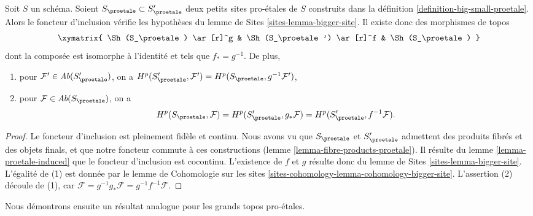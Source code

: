 \begin{lemma}
\label{lemma-proetale-cohomology-independent-partial-universe}
Soit $S$ un schéma. Soient $S_\proetale \subset S_\proetale'$ deux
petits sites pro-\'etales de $S$ construits dans la
définition \ref{definition-big-small-proetale}. Alors le foncteur d'inclusion
vérifie les hypothèses du
lemme de Sites \ref{sites-lemma-bigger-site}.
Il existe donc des morphismes de topos
$$
\xymatrix{
\Sh(S_\proetale) \ar[r]^g &
\Sh(S_\proetale') \ar[r]^f &
\Sh(S_\proetale)
}
$$
dont la composée est isomorphe à l'identité et tels que $f_* = g^{-1}$.
De plus,
\begin{enumerate}
\item pour $\mathcal{F}' \in \textit{Ab}(S_\proetale')$, on a
$H^p(S_\proetale', \mathcal{F}') = H^p(S_\proetale, g^{-1}\mathcal{F}')$,
\item pour $\mathcal{F} \in \textit{Ab}(S_\proetale)$, on a
$$
H^p(S_\proetale, \mathcal{F}) =
H^p(S_\proetale', g_*\mathcal{F}) =
H^p(S_\proetale', f^{-1}\mathcal{F}).
$$
\end{enumerate}
\end{lemma}

\begin{proof}
Le foncteur d'inclusion est pleinement fidèle et continu.
Nous avons vu que $S_\proetale$ et $S_\proetale'$ admettent des produits fibrés
et des objets finals, et que notre foncteur commute à ces constructions
(lemme \ref{lemma-fibre-products-proetale}).
Il résulte du lemme \ref{lemma-proetale-induced}
que le foncteur d'inclusion est cocontinu.
L'existence de $f$ et $g$ résulte donc du
lemme de Sites \ref{sites-lemma-bigger-site}.
L'égalité de (1) est donnée par le
lemme de Cohomologie sur les sites \ref{sites-cohomology-lemma-cohomology-bigger-site}.
L'assertion (2) découle de (1), car
$\mathcal{F} = g^{-1}g_*\mathcal{F} = g^{-1}f^{-1}\mathcal{F}$.
\end{proof}

\noindent
Nous démontrons ensuite un résultat analogue pour les grands topos pro-\'etales.

